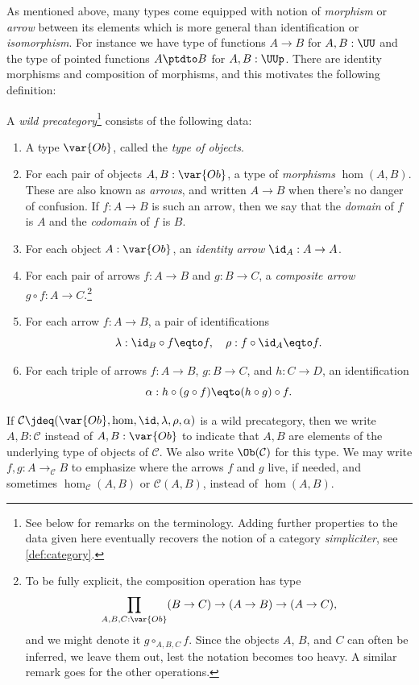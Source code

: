 As mentioned above, many types come equipped with notion
of \emph{morphism} or \emph{arrow} between its elements
which is more general than identification or \emph{isomorphism}.
For instance
we have type of functions $A \to B$ for $A,B:\UU$
and the type of pointed functions $A \ptdto B$ for $A,B:\UUp$.
There are identity morphisms and composition of morphisms,
and this motivates the following definition:

\begin{definition}\label{def:wild-cat}
  A \emph{wild precategory}\footnote{%
    See below for remarks on the terminology.
    Adding further properties to the data given here eventually
    recovers the notion of a category \emph{simpliciter},
    see \cref{def:category}.}
  consists of the following data:
  \begin{enumerate}
  \item\label{struc:cat-ob} A type $\var{Ob}$, called the \emph{type of objects}.
  \item\label{struc:cat-mor} For each pair of objects $A,B : \var{Ob}$,
    a type of \emph{morphisms} $\hom(A,B)$. These are also known as \emph{arrows},
    and written $A \to B$ when there's no danger of confusion.
    If $f : A \to B$ is such an arrow, then we say that the \emph{domain} of $f$ is $A$
    and the \emph{codomain} of $f$ is $B$.
  \item\label{struc:cat-id} For each object $A : \var{Ob}$,
    an \emph{identity arrow} $\id_A : A \to A$.
  \item\label{struc:cat-comp} For each pair of arrows $f : A \to B$ and $g : B \to C$,
    a \emph{composite arrow} $g\circ f : A \to C$.\footnote{%
      To be fully explicit, the composition operation has
      type
      \[
        \prod_{A,B,C:\var{Ob}}(B \to C) \to (A \to B) \to (A \to C),
      \]
      and we might denote it $g \circ_{A,B,C} f$.
      Since the objects $A$, $B$, and $C$ can often be inferred,
      we leave them out, lest the notation becomes too heavy.
      A similar remark goes for the other operations.}
  \item\label{struc:cat-unit-laws} For each arrow $f : A \to B$,
    a pair of identifications
    \[
      \lambda : \id_B \circ f \eqto f, \quad
      \rho : f \circ \id_A \eqto f.
    \]
  \item\label{struct:cat-assoc} For each triple of arrows
    $f : A \to B$, $g : B \to C$, and $h : C \to D$, an identification
    \[
      \alpha : h \circ (g \circ f) \eqto (h \circ g) \circ f.
    \]
  \end{enumerate}
  If $\mathcal C \jdeq (\var{Ob},\hom,\id,\lambda,\rho,\alpha)$
  is a wild precategory, then we write $A, B : \mathcal C$ instead of $A, B : \var{Ob}$
  to indicate that $A, B$ are elements of the underlying type of objects of $\mathcal C$.
  We also write $\Ob(\mathcal C)$ for this type.
  We may write $f, g : A \to_{\mathcal C} B$ to emphasize where the arrows $f$ and $g$ live, if needed,
  and sometimes $\hom_{\mathcal C}(A,B)$ or $\mathcal C(A,B)$, instead of $\hom(A,B)$.
\end{definition}

